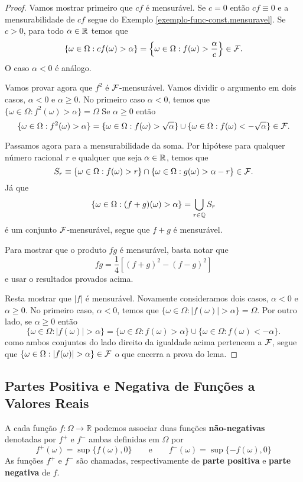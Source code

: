 \begin{proof}
Vamos mostrar primeiro que $cf$ é mensurável. 
Se $c=0$ então $cf\equiv 0$ e a mensurabilidade de $cf$
segue do Exemplo \ref{exemplo-func-const.mensuravel}.
Se $c>0$, para todo $\alpha\in\mathbb{R}$ temos que
\[ 
	\{ \omega\in \Omega: cf(\omega)>\alpha\}
	=
	\left\{ \omega\in \Omega: f(\omega)>\frac{\alpha}{c} \right\}
	\in \mathcal{F}.
\]
O caso $\alpha<0$ é análogo.

Vamos provar agora que $f^2$ é $\mathcal{F}$-mensurável. 
Vamos dividir o argumento em 
dois casos, $\alpha<0$ e $\alpha \geq 0$.
No primeiro caso $\alpha<0$, temos que 
$\{ \omega\in \Omega: f^2(\omega)>\alpha\} = \Omega$
Se $\alpha\geq 0$ então 
\[ 
	\{ \omega\in \Omega: f^2(\omega)>\alpha\} 
	=
	\{ \omega\in \Omega: f(\omega)>\sqrt{\alpha}\} 
	\cup
	\{ \omega\in \Omega: f(\omega)<-\sqrt{\alpha}\}
	\in 
	\mathcal{F}. 
\]

Passamos agora para a mensurabilidade da soma. 
Por hipótese para qualquer número racional $r$
e qualquer que seja $\alpha\in\mathbb{R}$, temos que 
\[
	S_r
	\equiv 
	\{ \omega\in\Omega: f(\omega)>r \} 
		\cap 
		\{ \omega\in\Omega: g(\omega)>\alpha-r \}
	\in 
	\mathcal{F}.
\]
Já que 
\[
	\{ \omega\in\Omega: (f+g)(\omega)>\alpha \}
	=
	\bigcup_{r\in \mathbb{Q}} S_r
\]
é um conjunto $\mathcal{F}$-mensurável, segue que $f+g$ é mensurável.

Para mostrar que o produto $fg$ é mensurável, basta 
notar que 
\[ fg = \frac{1}{4}[(f+g)^2-(f-g)^2] \]
e usar o resultados provados acima.

Resta mostrar que $|f|$ é mensurável.
Novamente consideramos dois casos, $\alpha<0$ e 
$\alpha\geq 0$. No primeiro caso, $\alpha<0$, temos que 
$\{\omega\in\Omega: |f(\omega)|>\alpha\} = \Omega$.
Por outro lado, se $\alpha\geq 0$ então 
\[ 
	\{\omega\in\Omega: |f(\omega)|>\alpha\} 
	= 
	\{\omega\in\Omega: f(\omega)>\alpha\} 
	\cup
	\{\omega\in\Omega: f(\omega)<-\alpha\} .
\]
como ambos conjuntos do lado direito da igualdade 
acima pertencem a $\mathcal{F}$, segue que 
$\{\omega\in\Omega: |f(\omega)|>\alpha\} \in \F$ o que 
encerra a prova do lema.
\end{proof}


\subsection*{Partes Positiva e Negativa de Funções a Valores Reais}

A cada função $f:\Omega\to\mathbb{R}$ podemos associar duas funções 
{\bf não-negativas} denotadas por $f^+$ e $f^-$ ambas definidas em $\Omega$
por 
	\[
		f^+(\omega)= \sup\{f(\omega),0\} 
		\qquad
		\text{e}
		\qquad
		f^-(\omega)= \sup\{-f(\omega),0\} 
	\]
As funções $f^+$ e $f^-$ são chamadas, respectivamente 
de {\bf parte positiva} e {\bf parte negativa} de $f$.

